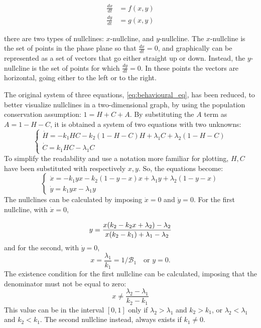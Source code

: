 \begin{align}
	\frac{dx}{dt} &= f(x,y) \\
	\frac{dy}{dt} &= g(x,y)
\end{align}

there are two types of nullclines: $x$-nullcline, and $y$-nullcline. The $x$-nullcline is the set of points in the phase plane so that $\frac{dx}{dt} =0$, and graphically can be represented as a set of vectors that go either straight up or down. Instead, the $y$-nullcline is the set of points for which $\frac{dy}{dt} =0$. In these points the vectors are horizontal, going either to the left or to the right.

The original system of three equations, \eqref{eq:behavioural_eq}, has been reduced, to better visualize nullclines in a two-dimensional graph, by using the population conservation assumption: $1 = H + C + A$. By substituting the $A$ term as $A = 1 - H- C$, it is obtained a system of two equations with two unknowns:
\[
\begin{cases}
	\dot{H} = -k_1 H C - k_2 (1-H-C) H + \lambda_1 C + \lambda_2 (1-H-C)\\
	\dot{C} = k_1 H C - \lambda_1 C
\end{cases}
\]
To simplify the readability and use a notation more familiar for plotting,  $H, C$ have been substituted with respectively $x, y$. So, the equations become:
\begin{equation}
\label{eq:system_nullclines}
\begin{cases}
	\dot{x} = -k_1 y x - k_2 (1-y-x) x + \lambda_1 y + \lambda_2 (1-y-x)\\
	\dot{y} = k_1 y x - \lambda_1 y
\end{cases}
\end{equation}
The nullclines can be calculated by imposing $\dot{x} = 0$ and $\dot{y} = 0$. For the first nullcline, with $\dot{x} = 0$,

\begin{equation}\\
\label{eq:x_nullcline}
 y = \frac{x(k_2 - k_2 x + \lambda_2) - \lambda_2}{x(k_2 - k_1)+ \lambda_1- \lambda_2}
\end{equation}
and for the second, with $\dot{y} = 0$,
\[x = \frac{\lambda_1}{k_1} = 1/\mathcal{B}_1 \quad \text{or } y = 0.
\]
The existence condition for the first nullcline can be calculated, imposing that the denominator must not be equal to zero:
\[ x \neq \frac{\lambda_2-\lambda_1}{k_2 - k_1} \]
This value can be in the interval $[0,1]$ only if $\lambda_2>\lambda_1$ and $k_2 > k_1$, or $\lambda_2<\lambda_1$ and $k_2 < k_1$. The second nullcline instead, always exists if $k_1 \neq 0$.

